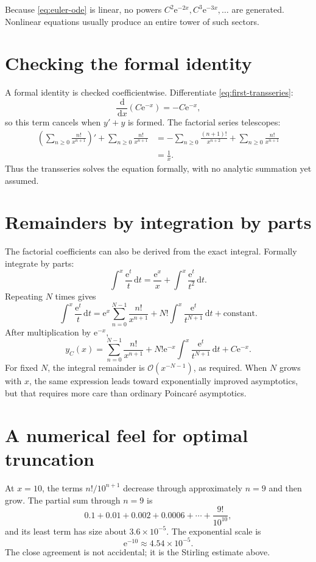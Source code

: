 \documentclass[11pt,openany]{book}
\theoremstyle{definition}
\theoremstyle{plain}
\theoremstyle{remark}
\newcommand{\dd}{\,\mathrm{d}}
\newcommand{\e}{\mathrm{e}}
\newcommand{\bigO}{\mathcal{O}}
\begin{document}
Because \cref{eq:euler-ode} is linear, no powers $C^2\e^{-2x},C^3\e^{-3x},\ldots$ are generated. Nonlinear equations usually produce an entire tower of such sectors.

\section{Checking the formal identity}

A formal identity is checked coefficientwise. Differentiate \cref{eq:first-transseries}:
\[
 \frac{\dd}{\dd x}\left(C\e^{-x}\right)=-C\e^{-x},
\]
so this term cancels when $y'+y$ is formed. The factorial series telescopes:
\begin{align*}
 \left(\sum_{n\ge0}\frac{n!}{x^{n+1}}\right)'
 +\sum_{n\ge0}\frac{n!}{x^{n+1}}
 &=-\sum_{n\ge0}\frac{(n+1)!}{x^{n+2}}
   +\sum_{n\ge0}\frac{n!}{x^{n+1}}\\
 &=\frac1x.
\end{align*}
Thus the transseries solves the equation formally, with no analytic summation yet assumed.

\section{Remainders by integration by parts}

The factorial coefficients can also be derived from the exact integral. Formally integrate by parts:
\[
 \int^x\frac{\e^t}{t}\dd t
 =\frac{\e^x}{x}+\int^x\frac{\e^t}{t^2}\dd t.
\]
Repeating $N$ times gives
\[
 \int^x\frac{\e^t}{t}\dd t
 =\e^x\sum_{n=0}^{N-1}\frac{n!}{x^{n+1}}
  +N!\int^x\frac{\e^t}{t^{N+1}}\dd t
  +\text{constant}.
\]
After multiplication by $\e^{-x}$,
\[
 y_C(x)=\sum_{n=0}^{N-1}\frac{n!}{x^{n+1}}
 +N!\e^{-x}\int^x\frac{\e^t}{t^{N+1}}\dd t
 +C\e^{-x}.
\]
For fixed $N$, the integral remainder is $\bigO(x^{-N-1})$, as required. When $N$ grows with $x$, the same expression leads toward exponentially improved asymptotics, but that requires more care than ordinary Poincar\'e asymptotics.

\section{A numerical feel for optimal truncation}

At $x=10$, the terms $n!/10^{n+1}$ decrease through approximately $n=9$ and then grow. The partial sum through $n=9$ is
\[
 0.1+0.01+0.002+0.0006+\cdots+\frac{9!}{10^{10}},
\]
and its least term has size about $3.6\times10^{-5}$. The exponential scale is
\[
 \e^{-10}\approx4.54\times10^{-5}.
\]
The close agreement is not accidental; it is the Stirling estimate above.
\end{document}
